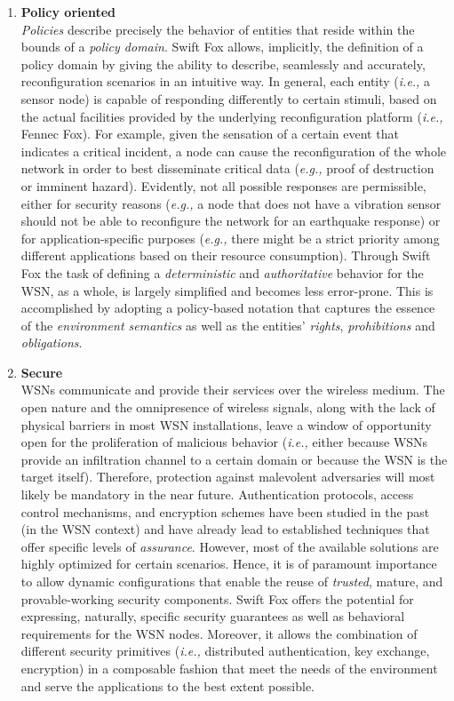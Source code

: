 \begin{enumerate}
	\item \textbf{Policy oriented}		\\
	\textit{Policies} describe precisely the behavior of entities
	that reside within the bounds of a \textit{policy domain}. Swift
	Fox allows, implicitly, the definition of a policy domain by
	giving the ability to describe, seamlessly and accurately,
	reconfiguration scenarios in an intuitive way. In general, each
	entity (\textit{i.e.,} a sensor node) is capable of responding
	differently to certain stimuli, based on the actual facilities
	provided by the underlying reconfiguration platform
	(\textit{i.e.,} Fennec Fox). For example, given the sensation of a
	certain event that indicates a critical incident, a node can cause
	the reconfiguration of the whole network in order to best
	disseminate critical data (\textit{e.g.,} proof of destruction
	or imminent hazard). Evidently, not all possible responses are
	permissible, either for security reasons (\textit{e.g.,} a node
	that does not have a vibration sensor should not be able to
	reconfigure the network for an earthquake response) or for
	application-specific purposes (\textit{e.g.,} there might be a
	strict priority among different applications based on their
	resource consumption). Through Swift Fox the task of defining a
	\textit{deterministic} and \textit{authoritative} behavior for the 
	WSN, as a whole, is largely simplified and becomes less
	error-prone. This is accomplished by adopting a policy-based
	notation that captures the essence of the \textit{environment
	semantics} as well as the entities' \textit{rights},
	\textit{prohibitions} and \textit{obligations}. 
	
	\item \textbf{Secure}			\\
	WSNs communicate and provide their services over the wireless
	medium. The open nature and the omnipresence of wireless signals,
	along with the lack of physical barriers in most WSN
	installations, leave a window of opportunity open for the
	proliferation of malicious behavior (\textit{i.e.,} either because
	WSNs provide an infiltration channel to a certain domain or
	because the WSN is the target itself). Therefore, protection
	against malevolent adversaries will most likely be mandatory in
	the near future. Authentication protocols, access control
	mechanisms, and encryption schemes have been studied in the past
	(in the WSN context) and have already lead to established
	techniques that offer specific levels of \textit{assurance}.
	However, most of the available solutions are highly optimized for 
	certain scenarios. Hence, it is of paramount importance to allow 
	dynamic configurations that enable the reuse of \textit{trusted}, 
	mature, and provable-working security components. Swift Fox offers
	the potential for expressing, naturally, specific security
	guarantees as well as behavioral requirements for the WSN nodes.
	Moreover, it allows the combination of different security
	primitives (\textit{i.e.,} distributed authentication, key
	exchange, encryption) in a composable fashion that meet the needs 
	of the environment and serve the applications to the best extent
	possible.


\end{enumerate}
